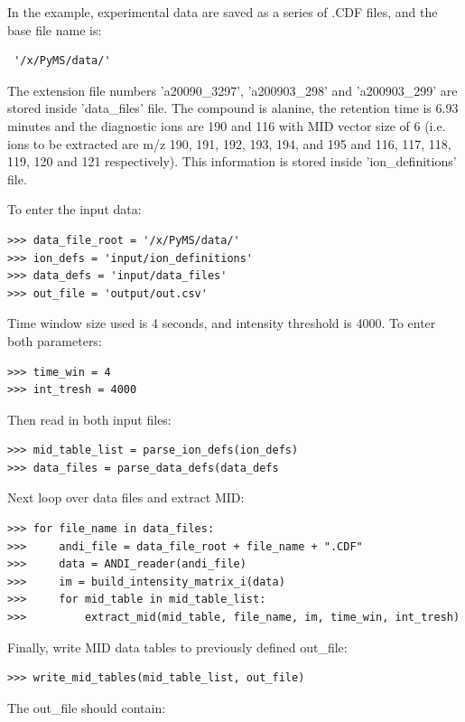 In the example, experimental data are saved as a series of .CDF files, and the base 
file name is:
\begin{verbatim}
 '/x/PyMS/data/'
\end{verbatim}

The extension file numbers 'a20090\_3297', 'a200903\_298' and 'a200903\_299' are stored inside
'data\_files' file. The compound is alanine, the retention time is 6.93 minutes 
and the diagnostic ions are 190 and 116 with MID vector size of 6 (i.e. ions to 
be extracted are m/z 190, 191, 192, 193, 194, and 195 and 116, 117, 118, 119, 
120 and 121 respectively). This information is stored inside 'ion\_definitions' 
file.

To enter the input data:

\begin{verbatim}
>>> data_file_root = '/x/PyMS/data/'
>>> ion_defs = 'input/ion_definitions'
>>> data_defs = 'input/data_files'
>>> out_file = 'output/out.csv'
\end{verbatim}

Time window size used is 4 seconds, and intensity threshold is 4000. To enter 
both parameters:

\begin{verbatim} 
>>> time_win = 4 
>>> int_tresh = 4000 
\end{verbatim}

Then read in both input files:
\begin{verbatim}
>>> mid_table_list = parse_ion_defs(ion_defs)
>>> data_files = parse_data_defs(data_defs
\end{verbatim}

Next loop over data files and extract MID:
\begin{verbatim}
>>> for file_name in data_files:
>>>     andi_file = data_file_root + file_name + ".CDF"
>>>     data = ANDI_reader(andi_file)
>>>     im = build_intensity_matrix_i(data)
>>>     for mid_table in mid_table_list:
>>>         extract_mid(mid_table, file_name, im, time_win, int_tresh)
\end{verbatim}

Finally, write MID data tables to previously defined out\_file:
\begin{verbatim}
>>> write_mid_tables(mid_table_list, out_file)
\end{verbatim}

The out\_file should contain:

\begin{verbatim}

\end{verbatim}

